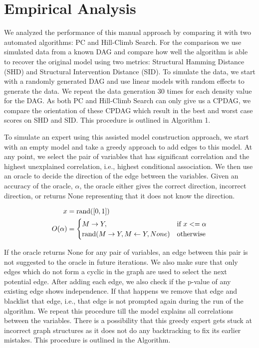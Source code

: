 \documentclass[letterpaper]{article} %
\begin{document}
\section{Empirical Analysis}
\label{sec:empirical}

We analyzed the performance of this manual approach by comparing it with two
automated algorithms: PC and Hill-Climb Search. For the comparison we use
simulated data from a known DAG and compare how well the algorithm is able to
recover the original model using two metrics: Structural Hamming Distance (SHD)
and Structural Intervention Distance (SID). To simulate the data, we start with
a randomly generated DAG and use linear models with random effects to generate
the data. We repeat the data generation $ 30 $ times for each density value for
the DAG. As both PC and Hill-Climb Search can only give us a CPDAG, we compare
the orientation of these CPDAG which result in the best and worst case scores
on SHD and SID. This procedure is outlined in Algorithm 1.


To simulate an expert using this assisted model construction approach, we start
with an empty model and take a greedy approach to add edges to this model. At
any point, we select the pair of variables that has significant correlation and
the highest unexplained correlation, i.e., highest conditional association. We
then use an oracle to decide the direction of the edge between the variables.
Given an accuracy of the oracle, $ \alpha $, the oracle either gives the
correct direction, incorrect direction, or returns None representing that it
does not know the direction.

\begin{equation}
	\begin{split}
		x &= \textnormal{rand}([0, 1]) \\
		O(\alpha) &= \begin{cases} 
			M \rightarrow Y, & \textnormal{if  } x <= \alpha \\
			\textnormal{rand}(M \rightarrow Y, M \leftarrow Y, None) & \textnormal{otherwise} \\
				\end{cases} \\
	\end{split}
\end{equation}

If the oracle returns None for any pair of variables, an edge between this pair
is not suggested to the oracle in future iterations. We also make sure that
only edges which do not form a cyclic in the graph are used to select the next
potential edge. After adding each edge, we also check if the p-value of any
existing edge shows independence. If that happens we remove that edge and
blacklist that edge, i.e., that edge is not prompted again during the run of
the algorithm. We repeat this procedure till the model explains all
correlations between the variables. There is a possibility that this greedy
expert gets stuck at incorrect graph structures as it does not do any
backtracking to fix its earlier mistakes. This procedure is outlined in the
Algorithm.
\end{document}

